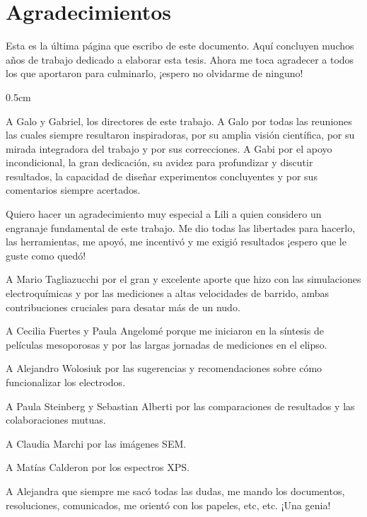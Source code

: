 \vfill
\cleardoublepage

\mtcaddchapter[Agradecimientos]	

\section*{\centering Agradecimientos} 

 \noindent Esta es la última página que escribo de este documento. Aquí concluyen muchos años de trabajo dedicado a elaborar esta tesis. Ahora me toca agradecer a todos los que aportaron para culminarlo, ¡espero no olvidarme de ninguno!

	 \begin{sangria_pers}{0.5cm}

	 A Galo y Gabriel, los directores de este trabajo. A Galo por todas las reuniones las cuales siempre resultaron inspiradoras, por su amplia visión científica, por su mirada integradora del trabajo y por sus correcciones. \linebreak A Gabi por el apoyo incondicional, la gran dedicación, su avidez para profundizar y discutir resultados, la capacidad de diseñar experimentos concluyentes y por sus comentarios siempre acertados.

	 Quiero hacer un agradecimiento muy especial a Lili a quien considero un engranaje fundamental de este trabajo. Me dio todas las libertades para hacerlo, las herramientas, me apoyó, me incentivó y me exigió resultados ¡espero que le guste como quedó!

	 A Mario Tagliazucchi por el gran y excelente aporte que hizo con las simulaciones electroquímicas y por las mediciones a altas velocidades de barrido, ambas contribuciones cruciales para desatar más de un nudo.  

	 A Cecilia Fuertes y Paula Angelomé porque me iniciaron en la síntesis de películas mesoporosas y por las largas jornadas de mediciones en el elipso.

	 A Alejandro Wolosiuk por las sugerencias y recomendaciones sobre cómo funcionalizar los electrodos.

	 A Paula Steinberg y Sebastian Alberti por las comparaciones de resultados y las colaboraciones mutuas.

	 A Claudia Marchi por las imágenes SEM.

	 A Matías Calderon por los espectros XPS.

	 A Alejandra que siempre me sacó todas las dudas, me mando los documentos, resoluciones, comunicados, me orientó con los papeles, etc, etc. ¡Una genia!


\end{sangria_pers}
